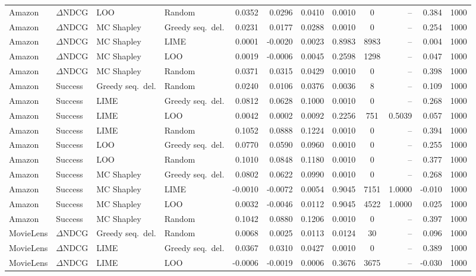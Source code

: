 \begin{longtable}{@{}p{}p{}p{}p{}rrrrcrrr@{}}
Amazon & $\Delta$NDCG & LOO & Random & 0.0352 & 0.0296 & 0.0410 & 0.0010 & 0 & -- & 0.384 & 1000 \\
Amazon & $\Delta$NDCG & MC Shapley & Greedy seq.\ del. & 0.0231 & 0.0177 & 0.0288 & 0.0010 & 0 & -- & 0.254 & 1000 \\
Amazon & $\Delta$NDCG & MC Shapley & LIME & 0.0001 & -0.0020 & 0.0023 & 0.8983 & 8983 & -- & 0.004 & 1000 \\
Amazon & $\Delta$NDCG & MC Shapley & LOO & 0.0019 & -0.0006 & 0.0045 & 0.2598 & 1298 & -- & 0.047 & 1000 \\
Amazon & $\Delta$NDCG & MC Shapley & Random & 0.0371 & 0.0315 & 0.0429 & 0.0010 & 0 & -- & 0.398 & 1000 \\
Amazon & Success & Greedy seq.\ del. & Random & 0.0240 & 0.0106 & 0.0376 & 0.0036 & 8 & -- & 0.109 & 1000 \\
Amazon & Success & LIME & Greedy seq.\ del. & 0.0812 & 0.0628 & 0.1000 & 0.0010 & 0 & -- & 0.268 & 1000 \\
Amazon & Success & LIME & LOO & 0.0042 & 0.0002 & 0.0092 & 0.2256 & 751 & 0.5039 & 0.057 & 1000 \\
Amazon & Success & LIME & Random & 0.1052 & 0.0888 & 0.1224 & 0.0010 & 0 & -- & 0.394 & 1000 \\
Amazon & Success & LOO & Greedy seq.\ del. & 0.0770 & 0.0590 & 0.0960 & 0.0010 & 0 & -- & 0.255 & 1000 \\
Amazon & Success & LOO & Random & 0.1010 & 0.0848 & 0.1180 & 0.0010 & 0 & -- & 0.377 & 1000 \\
Amazon & Success & MC Shapley & Greedy seq.\ del. & 0.0802 & 0.0622 & 0.0990 & 0.0010 & 0 & -- & 0.268 & 1000 \\
Amazon & Success & MC Shapley & LIME & -0.0010 & -0.0072 & 0.0054 & 0.9045 & 7151 & 1.0000 & -0.010 & 1000 \\
Amazon & Success & MC Shapley & LOO & 0.0032 & -0.0046 & 0.0112 & 0.9045 & 4522 & 1.0000 & 0.025 & 1000 \\
Amazon & Success & MC Shapley & Random & 0.1042 & 0.0880 & 0.1206 & 0.0010 & 0 & -- & 0.397 & 1000 \\
MovieLens & $\Delta$NDCG & Greedy seq.\ del. & Random & 0.0068 & 0.0025 & 0.0113 & 0.0124 & 30 & -- & 0.096 & 1000 \\
MovieLens & $\Delta$NDCG & LIME & Greedy seq.\ del. & 0.0367 & 0.0310 & 0.0427 & 0.0010 & 0 & -- & 0.389 & 1000 \\
MovieLens & $\Delta$NDCG & LIME & LOO & -0.0006 & -0.0019 & 0.0006 & 0.3676 & 3675 & -- & -0.030 & 1000 \\

\end{longtable}
